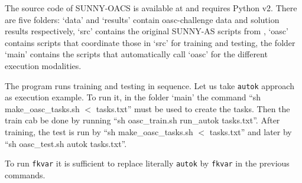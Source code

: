 \documentclass[tablecaption=bottom,wcp]{jmlr} %
\begin{document}
The source code of SUNNY-OACS is available at \cite{sunnyoasc} and requires 
Python v2. There are five folders: `data' and `results' contain oasc-challenge 
data and solution results respectively, `src' contains the original SUNNY-AS 
scripts from \cite{sunnyas}, `oasc' contains scripts that coordinate those in 
`src' for training and testing, the folder `main' contains the scripts that 
automatically call `oasc' for the different execution modalities. 

The program runs training and testing in sequence. Let us take \texttt{autok} 
approach as execution example. To run it, in the folder `main' the 
command ``sh make\_oasc\_tasks.sh $<$ tasks.txt'' must be used to create 
the tasks. Then the train cab be done by running ``sh oasc\_train.sh 
run\_autok tasks.txt''. After training, the test is run by ``sh 
make\_oasc\_tasks.sh $<$ tasks.txt'' and later by ``sh oasc\_test.sh autok 
tasks.txt''.

To run \texttt{fkvar} it is sufficient to replace 
literally \texttt{autok} by \texttt{fkvar} in the previous commands. 



\end{document}
